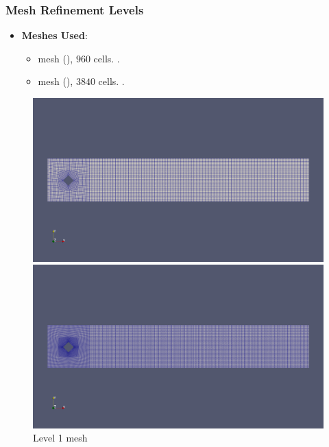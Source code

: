 \documentclass{settings/laserbeam}
\begin{document}
\begin{frame}
    
    \frametitle{Mesh Refinement Levels}

    \begin{cbox}
    \begin{itemize}
        \item \textbf{Meshes Used}:
        \begin{itemize}
            \item {} mesh (), $960$ cells. .
            \item {} mesh (), $3840$ cells. .
        \end{itemize}
    \end{itemize}
    \end{cbox}
    \vspace{0.2cm}
    \begin{center}
        \begin{figure}[H]
            \begin{minipage}{0.4\linewidth}
                \begin{center}
                   \includegraphics[width=1\linewidth]{images/2_ref_levels.png}
                   \caption{Level 1 mesh}
                \end{center}
            \end{minipage}
            \qquad
            \qquad
            \begin{minipage}{0.4\linewidth}
                \begin{center}
                    \includegraphics[width=1\linewidth]{images/3_ref_levels.png}

\end{center}
\end{minipage}
\end{figure}
\end{center}
\end{frame}
\end{document}
